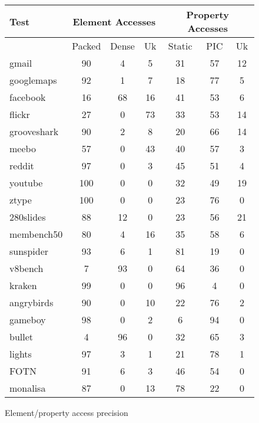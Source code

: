 \begin{figure}
\begin{center}
\begin{tabular}{|l|ccc|ccc|}
\hline
Test & \multicolumn{3}{|c|}{Element Accesses}
     & \multicolumn{3}{|c|}{Property Accesses} \\
\hline
     & Packed & Dense & Uk
     & Static & PIC & Uk \\
\hline
gmail          & 90 & 4 & 5 & 31 & 57 & 12 \\
googlemaps     & 92 & 1 & 7 & 18 & 77 & 5 \\
facebook       & 16 & 68 & 16 & 41 & 53 & 6 \\
flickr         & 27 & 0 & 73 & 33 & 53 & 14 \\
grooveshark    & 90 & 2 & 8 & 20 & 66 & 14 \\
meebo          & 57 & 0 & 43 & 40 & 57 & 3 \\
reddit         & 97 & 0 & 3 & 45 & 51 & 4 \\
youtube        & 100 & 0 & 0 & 32 & 49 & 19 \\
ztype          & 100 & 0 & 0 & 23 & 76 & 0 \\
280slides      & 88 & 12 & 0 & 23 & 56 & 21 \\
membench50     & 80 & 4 & 16 & 35 & 58 & 6 \\
sunspider      & 93 & 6 & 1 & 81 & 19 & 0 \\
v8bench        & 7 & 93 & 0 & 64 & 36 & 0 \\
kraken         & 99 & 0 & 0 & 96 & 4 & 0 \\
angrybirds     & 90 & 0 & 10 & 22 & 76 & 2 \\
gameboy        & 98 & 0 & 2 & 6 & 94 & 0 \\
bullet         & 4 & 96 & 0 & 32 & 65 & 3 \\
lights         & 97 & 3 & 1 & 21 & 78 & 1 \\
FOTN           & 91 & 6 & 3 & 46 & 54 & 0 \\
monalisa       & 87 & 0 & 13 & 78 & 22 & 0 \\
\hline
\end{tabular}
\end{center}
\caption{Element/property access precision}
\end{figure}

